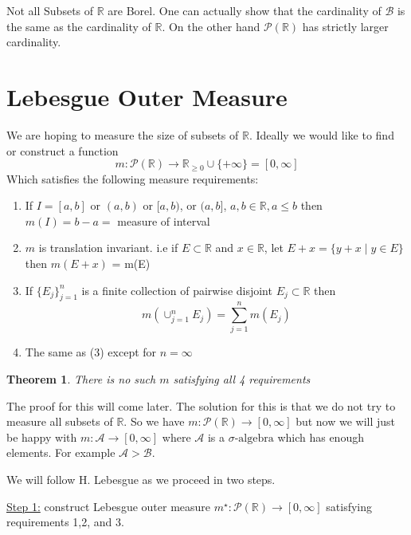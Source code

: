 \documentclass[11pt]{article}
\newtheorem{theorem}{Theorem}[section]
\newcommand{\siga}{\sigma\text{-algebra}}
\newcommand{\pwr}[1]{\mathcal{P}(\mathbb{#1})}
\begin{document}
    Not all Subsets of $\mathbb{R}$ are Borel.
    One can actually show that the cardinality of $\mathcal{B}$ is the same as the cardinality of $\mathbb{R}$.
    On the other hand $\mathcal{P}(\mathbb{R})$ has strictly larger cardinality.


    \section{Lebesgue Outer Measure}\label{sec:legesgue-outer-measure}

    We are hoping to measure the size of subsets of $\mathbb{R}$.
    Ideally we would like to find or construct a function
    \[
        m: \pwr{R} \rightarrow \mathbb{R}_{\geq 0} \cup \{ + \infty \} = [0, \infty]
    \]
    Which satisfies the following measure requirements:
    \begin{enumerate}
        \item If $I=[a,b]$ or $(a,b)$ or $[a,b)$, or $(a,b]$, $a,b \in \mathbb{R}, a \leq b$ then $m(I) = b-a = $ measure of interval
        \item $m$ is translation invariant.
        i.e if $E \subset \mathbb{R}$ and $x \in \mathbb{R}$, let $E + x = \{ y+x \mid y \in E \}$ then $m(E+x)$ = m(E)
        \item If $\{ E_j \}_{j=1}^{n}$ is a finite collection of pairwise disjoint $E_j \subset \mathbb{R}$ then
        \[
            m \left( \cup_{j=1}^{n} E_j \right) = \sum_{j=1}^{n} m(E_j)
        \]
        \item The same as (3) except for $n = \infty$
    \end{enumerate}

    \begin{theorem}
        There is no such $m$ satisfying all 4 requirements
    \end{theorem}

    The proof for this will come later.
    The solution for this is that we do not try to measure all subsets of $\mathbb{R}$.
    So we have $m: \pwr{R} \rightarrow [0, \infty]$ but now we will just be happy with $m: \mathcal{A} \rightarrow [0,\infty]$ where $\mathcal{A}$ is a $\siga$ which has enough elements.
    For example $\mathcal{A} > \mathcal{B}$.

    We will follow H. Lebesgue as we proceed in two steps.

    \underline{Step 1:} construct Lebesgue outer measure $m^{\star}: \pwr{R} \rightarrow [0, \infty]$ satisfying requirements 1,2, and 3.
\end{document}
